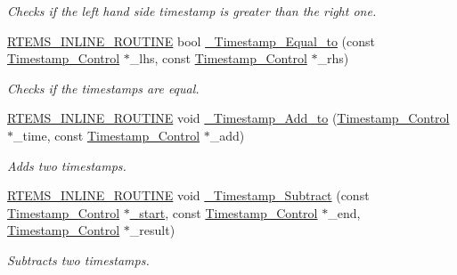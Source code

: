 \begin{DoxyCompactItemize}
\begin{DoxyCompactList}\small\item\em Checks if the left hand side timestamp is greater than the right one. \end{DoxyCompactList}\item 
\mbox{\hyperlink{group__RTEMSScoreBaseDefs_gac216239df231d5dbd15e3520b0b9313f}{R\+T\+E\+M\+S\+\_\+\+I\+N\+L\+I\+N\+E\+\_\+\+R\+O\+U\+T\+I\+NE}} bool \mbox{\hyperlink{group__SuperCoreTimeStamp_ga41ac4e996cd371410aa431a2d273bba2}{\+\_\+\+Timestamp\+\_\+\+Equal\+\_\+to}} (const \mbox{\hyperlink{group__SuperCoreTimeStamp_ga8508036506d5211c98844c88045e2410}{Timestamp\+\_\+\+Control}} $\ast$\+\_\+lhs, const \mbox{\hyperlink{group__SuperCoreTimeStamp_ga8508036506d5211c98844c88045e2410}{Timestamp\+\_\+\+Control}} $\ast$\+\_\+rhs)
\begin{DoxyCompactList}\small\item\em Checks if the timestamps are equal. \end{DoxyCompactList}\item 
\mbox{\hyperlink{group__RTEMSScoreBaseDefs_gac216239df231d5dbd15e3520b0b9313f}{R\+T\+E\+M\+S\+\_\+\+I\+N\+L\+I\+N\+E\+\_\+\+R\+O\+U\+T\+I\+NE}} void \mbox{\hyperlink{group__SuperCoreTimeStamp_gaae6a0b857c8470d50286bc24aa812f4e}{\+\_\+\+Timestamp\+\_\+\+Add\+\_\+to}} (\mbox{\hyperlink{group__SuperCoreTimeStamp_ga8508036506d5211c98844c88045e2410}{Timestamp\+\_\+\+Control}} $\ast$\+\_\+time, const \mbox{\hyperlink{group__SuperCoreTimeStamp_ga8508036506d5211c98844c88045e2410}{Timestamp\+\_\+\+Control}} $\ast$\+\_\+add)
\begin{DoxyCompactList}\small\item\em Adds two timestamps. \end{DoxyCompactList}\item 
\mbox{\hyperlink{group__RTEMSScoreBaseDefs_gac216239df231d5dbd15e3520b0b9313f}{R\+T\+E\+M\+S\+\_\+\+I\+N\+L\+I\+N\+E\+\_\+\+R\+O\+U\+T\+I\+NE}} void \mbox{\hyperlink{group__SuperCoreTimeStamp_gadc45a1a25f125cdc3c1dcdb4cd86b4cc}{\+\_\+\+Timestamp\+\_\+\+Subtract}} (const \mbox{\hyperlink{group__SuperCoreTimeStamp_ga8508036506d5211c98844c88045e2410}{Timestamp\+\_\+\+Control}} $\ast$\mbox{\hyperlink{group__RTEMSBSPsPowerPCSharedStart_ga8b67a6ff3f33fae9b3f1b142005c0bc2}{\+\_\+start}}, const \mbox{\hyperlink{group__SuperCoreTimeStamp_ga8508036506d5211c98844c88045e2410}{Timestamp\+\_\+\+Control}} $\ast$\+\_\+end, \mbox{\hyperlink{group__SuperCoreTimeStamp_ga8508036506d5211c98844c88045e2410}{Timestamp\+\_\+\+Control}} $\ast$\+\_\+result)
\begin{DoxyCompactList}\small\item\em Subtracts two timestamps. \end{DoxyCompactList}\item 

\end{DoxyCompactItemize}
